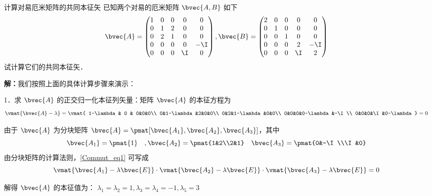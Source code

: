 \begin{example}{计算对易厄米矩阵的共同本征矢}
已知两个对易的厄米矩阵 $\bvec{A,B}$ 如下
\begin{equation}
\bvec{A} = \begin{pmatrix}
1 & 0 & 0&0&0\\
0&1&2&0&0\\
0&2&1&0&0\\
0&0&0&0&-\I\\
0&0&0&\I&0
\end{pmatrix}
,
\bvec{B} = \begin{pmatrix}
2 & 0 & 0&0&0\\
0&1&0&0&0\\
0&0&1&0&0\\
0&0&0&2&-\I\\
0&0&0&\I&2
\end{pmatrix}
\end{equation}
试计算它们的共同本征矢．
\end{example}
\textbf{解：}我们按照上面的具体计算步骤来演示：

1．求 $\bvec{A}$ 的正交归一化本征列矢量：矩阵 $\bvec{A}$ 的本征方程为
\begin{equation}\label{Commut_eq1}
\vmat{\bvec{A}-\lambda}=
\vmat{
1-\lambda & 0 & 0&0&0\\
0&1-\lambda&2&0&0\\
0&2&1-\lambda&0&0\\
0&0&0&0-\lambda&-\I\\
0&0&0&\I&0-\lambda
}=0
\end{equation}

由于 $\bvec{A}$ 为分块矩阵 $\bvec{A}=\pmat[\bvec{A_1},\bvec{A_2},\bvec{A_3}]$，其中
\begin{equation}
\bvec{A_1}=\pmat{1}\quad ,\bvec{A_2}=\pmat{1&2\\2&1}\quad
\bvec{A_3}=\pmat{0&-\I\\\I&0}
\end{equation}
由分块矩阵的计算法则，\autoref{Commut_eq1} 可写成
\begin{equation}
\vmat{\bvec{A_1}-\lambda\bvec{E}}\cdot \vmat{\bvec{A_2}-\lambda\bvec{E}}\cdot\vmat{\bvec{A_3}-\lambda\bvec{E}}=0
\end{equation}


解得 $\bvec{A}$ 的本征值为： $\lambda_1=\lambda_2=1,\lambda_3=\lambda_4=-1,\lambda_5=3$

